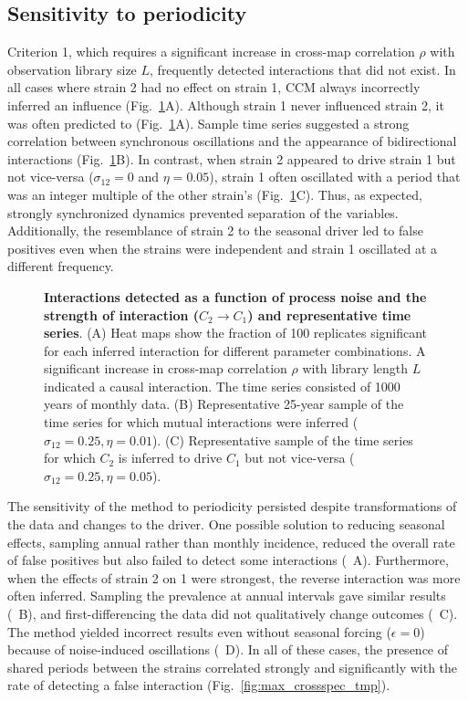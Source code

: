 \documentclass[10pt,letterpaper]{article}
\begin{document}
\subsection*{Sensitivity to periodicity}

Criterion 1, which requires a significant increase in cross-map correlation $\rho$ with observation library size $L$, frequently detected interactions that did not exist.
In all cases where strain 2 had no effect on strain 1, CCM always incorrectly inferred an influence (Fig.~\ref{fig:univar_monthly_hm_tmp}A).
Although strain 1 never influenced strain 2, it was often predicted to (Fig.~\ref{fig:univar_monthly_hm_tmp}A). 
Sample time series suggested a strong correlation between synchronous oscillations and the appearance of bidirectional interactions (Fig.~\ref{fig:univar_monthly_hm_tmp}B).
In contrast, when strain 2 appeared to drive strain 1 but not vice-versa ($\sigma_{12}=0$ and $\eta=0.05$), strain 1 often oscillated with a period that was an integer multiple of the other strain's (Fig.~\ref{fig:univar_monthly_hm_tmp}C).
Thus, as expected, strongly synchronized dynamics prevented separation of the variables.
Additionally, the resemblance of strain 2 to the seasonal driver led to false positives even when the strains were independent and strain 1 oscillated at a different frequency.

\begin{figure}
  \caption{\textbf{Interactions detected as a function of process noise and the strength of interaction ($C_2 \rightarrow C_1$) and representative time series}. (A) Heat maps show the fraction of 100 replicates significant for each inferred interaction for different parameter combinations. A significant increase in cross-map correlation $\rho$ with library length $L$ indicated a causal interaction. The time series consisted of 1000 years of monthly data. (B) Representative 25-year sample of the time series for which mutual interactions were inferred ($\sigma_{12}=0.25, \eta=0.01$). (C) Representative sample of the time series for which $C_2$ is inferred to drive $C_1$ but not vice-versa ($\sigma_{12}=0.25, \eta=0.05$).  \label{fig:univar_monthly_hm_tmp}} 
\end{figure}

The sensitivity of the method to periodicity persisted despite transformations of the data and changes to the  driver. 
One possible solution to reducing seasonal effects, sampling annual rather than monthly incidence, reduced the overall rate of false positives but also failed to detect some interactions (~A).
Furthermore, when the effects of strain 2 on 1 were strongest, the reverse interaction was more often inferred.
Sampling the prevalence at annual intervals gave similar results (~B), and first-differencing the data did not qualitatively change outcomes (~C).
The method yielded incorrect results even without seasonal forcing ($\epsilon=0$) because of noise-induced oscillations (~D).
In all of these cases, the presence of shared periods between the strains correlated strongly and significantly with the rate of detecting a false interaction (Fig.~\ref{fig:max_crossspec_tmp}).
\end{document}
